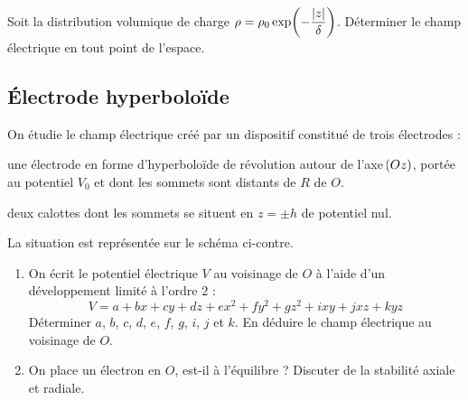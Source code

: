 \documentclass[a4paper,french,bookmarks]{book}
\begin{document}
    Soit la distribution volumique de charge $\rho = \rho_0\exp\p{-\dfrac{\mod{z}}{\delta}}$. Déterminer le champ électrique en tout point de l'espace.
    
    
    \subsection{Électrode hyperboloïde}
    
    \begin{minipage}{0.6\linewidth}
        On étudie le champ électrique créé par un dispositif constitué de trois électrodes :
        \begin{enumerate}
            \itt une électrode en forme d'hyperboloïde de révolution autour de l'axe $\!\left(Oz\right)$, portée au potentiel $V_0$ et dont les sommets sont distants de $R$ de $O$.
            
            \itt deux calottes dont les sommets se situent en $z = \pm h$ de potentiel nul.
        \end{enumerate}
        La situation est représentée sur le schéma ci-contre.
    \end{minipage}
    \begin{minipage}{0.4\linewidth}
        
    \end{minipage}
    
    \begin{enumerate}
        \item On écrit le potentiel électrique $V$ au voisinage de $O$ à l'aide d'un développement limité à l'ordre $2$ :
        \[ V = a + bx + cy + dz + ex^2 + fy^2 + gz^2 + ixy + jxz + kyz\]
        Déterminer $a$, $b$, $c$, $d$, $e$, $f$, $g$, $i$, $j$ et $k$. En déduire le champ électrique au voisinage de $O$.
        
        \item On place un électron en $O$, est-il à l'équilibre ? Discuter de la stabilité axiale et radiale.
    \end{enumerate}
    
\end{document}
